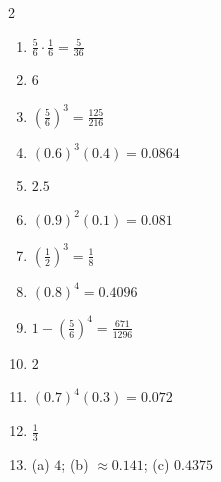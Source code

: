 \documentclass[11pt]{article}
\begin{document}
\begin{keybox}
\begin{multicols}{2}
\small
\begin{enumerate}[leftmargin=*,itemsep=3pt]
  \item $\tfrac56\cdot\tfrac16=\tfrac{5}{36}$
  \item $6$
  \item $\left(\tfrac56\right)^3=\tfrac{125}{216}$
  \item $(0.6)^3(0.4)=0.0864$
  \item $2.5$
  \item $(0.9)^2(0.1)=0.081$
  \item $\left(\tfrac12\right)^3=\tfrac18$
  \item $(0.8)^4=0.4096$
  \item $1-\left(\tfrac56\right)^4=\tfrac{671}{1296}$
  \item $2$
  \item $(0.7)^4(0.3)=0.072$
  \item $\tfrac13$
  \item (a) $4$; (b) $\approx0.141$; (c) $0.4375$
\end{enumerate}
\end{multicols}
\end{keybox}
\end{document}
